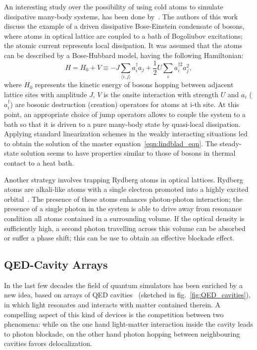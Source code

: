 An interesting study over the possibility of using cold atoms to simulate dissipative many-body systems, has been done by~\cite{BEC_dissipativeMBsimulator}. The authors of this work discuss the example of a driven dissipative Bose-Einstein condensate of bosons, where atoms in optical lattice are coupled to a bath of Bogoliubov excitations; the atomic current represents local dissipation. It was assumed that the atoms can be described by a Bose-Hubbard model, having the following Hamiltonian:
\begin{equation}
    H = H_0 + V \equiv -J \sum_{\langle i,j \rangle} a_i^{\dagger} a_j + \frac{1}{2}U \sum_i a_i^{\dagger 2} a_j^2,
\end{equation}
where $H_0$ represents the kinetic energy of bosons hopping between
adjacent lattice sites with amplitude $J$, $V$ is the onsite interaction
with strength $U$ and $a_i$ ($a_i^{\dagger}$) are bosonic destruction (creation)
operators for atoms at i-th site. At this point, an appropriate choice of jump operators allows to couple the system to a bath so that it is driven to a pure many-body state by quasi-local dissipation. Applying standard linearization schemes in the weakly interacting situations led to obtain the solution of the master equation~\ref{eqn:lindblad_eqn}. The steady-state solution seems to have properties similar to those of bosons in thermal contact to a heat bath.

Another strategy involves trapping Rydberg atoms in optical lattices. Rydberg atoms are alkali-like atoms with a single electron promoted into a highly excited orbital~\cite{carusotto_ciuti}. The presence of these atoms enhances photon-photon interaction; the presence of a single photon in the system is able to drive away from resonance condition all atoms contained in a surrounding volume. If the optical density is sufficiently high, a second photon travelling across this volume can be absorbed or suffer a phase shift; this can be use to obtain an effective blockade effect.

\subsection{QED-Cavity Arrays}
In the last few decades the field of quantum simulators has been enriched by a new idea, based on arrays of QED cavities~\cite{Tomadin_Fazio} (sketched in fig.~\ref{fig:QED_cavities}), in which light resonates and interacts with matter contained therein.  A compelling aspect of this kind of devices is the competition between two phenomena: while on the one hand light-matter interaction inside the cavity leads to photon blockade, on the other hand photon hopping between neighbouring cavities favors delocalization.

